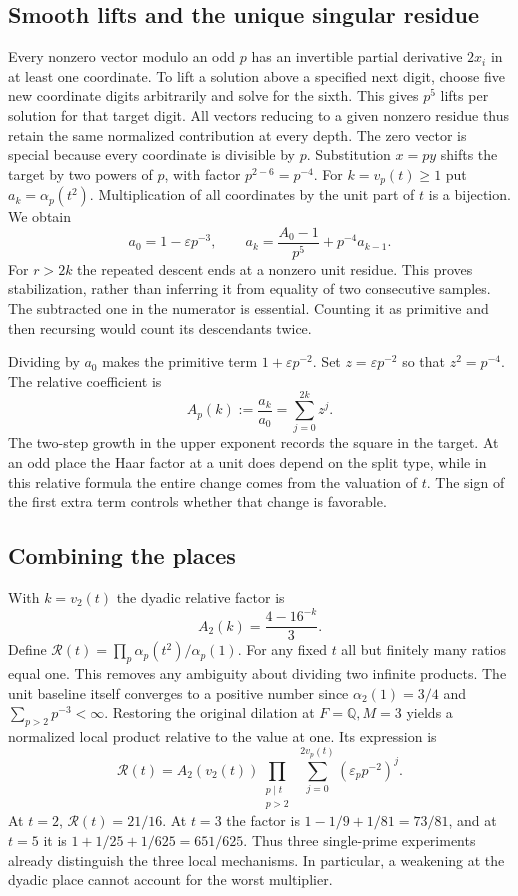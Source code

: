 \documentclass[12pt,letterpaper]{article}
\begin{document}
\subsection{Smooth lifts and the unique singular residue}
Every nonzero vector modulo an odd $p$ has an invertible partial derivative $2x_i$ in at least one coordinate. To lift a solution above a specified next digit, choose five new coordinate digits arbitrarily and solve for the sixth. This gives $p^5$ lifts per solution for that target digit. All vectors reducing to a given nonzero residue thus retain the same normalized contribution at every depth. The zero vector is special because every coordinate is divisible by $p$. Substitution $x=py$ shifts the target by two powers of $p$, with factor $p^{2-6}=p^{-4}$. For $k=v_p(t)\ge1$ put $a_k=\alpha_p(t^2)$. Multiplication of all coordinates by the unit part of $t$ is a bijection. We obtain
\[
 a_0=1-\varepsilon p^{-3},\qquad
 a_k=\frac{A_0-1}{p^5}+p^{-4}a_{k-1}.
\]
For $r>2k$ the repeated descent ends at a nonzero unit residue. This proves stabilization, rather than inferring it from equality of two consecutive samples. The subtracted one in the numerator is essential. Counting it as primitive and then recursing would count its descendants twice.
\par
Dividing by $a_0$ makes the primitive term $1+\varepsilon p^{-2}$. Set $z=\varepsilon p^{-2}$ so that $z^2=p^{-4}$. The relative coefficient is
\[
 A_p(k):=\frac{a_k}{a_0}=\sum_{j=0}^{2k}z^j .
\]
The two-step growth in the upper exponent records the square in the target. At an odd place the Haar factor at a unit does depend on the split type, while in this relative formula the entire change comes from the valuation of $t$. The sign of the first extra term controls whether that change is favorable.
\subsection{Combining the places}
With $k=v_2(t)$ the dyadic relative factor is
\[
 A_2(k)=\frac{4-16^{-k}}{3}.
\]
Define $\mathcal R(t)=\prod_p\alpha_p(t^2)/\alpha_p(1)$. For any fixed $t$ all but finitely many ratios equal one. This removes any ambiguity about dividing two infinite products. The unit baseline itself converges to a positive number since $\alpha_2(1)=3/4$ and $\sum_{p>2}p^{-3}<\infty$. Restoring the original dilation at $F=\mathbb Q,M=3$ yields a normalized local product relative to the value at one. Its expression is
\[
 \mathcal R(t)=A_2(v_2(t))
 \prod_{\substack{p\mid t\\p>2}}\ \sum_{j=0}^{2v_p(t)}(\varepsilon_p p^{-2})^j .
\]
At $t=2$, $\mathcal R(t)=21/16$. At $t=3$ the factor is $1-1/9+1/81=73/81$, and at $t=5$ it is $1+1/25+1/625=651/625$. Thus three single-prime experiments already distinguish the three local mechanisms. In particular, a weakening at the dyadic place cannot account for the worst multiplier.
\end{document}
